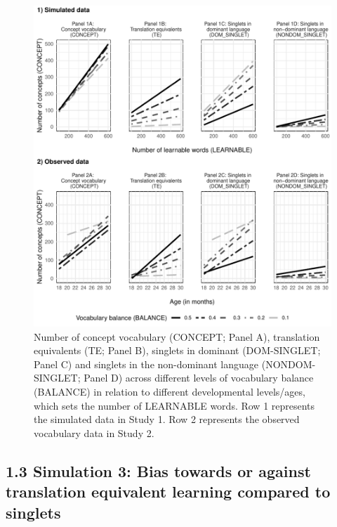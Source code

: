 \documentclass[
  english,
  ,man,floatsintext]{apa6}
\begin{document}
\begin{figure}[H]

{\centering \includegraphics[width=1\linewidth]{paper_TE_bilingual_vocabulary_model_files/figure-latex/fig2-1} 

}

\caption{Number of concept vocabulary (CONCEPT; Panel A), translation equivalents (TE; Panel B), singlets in dominant (DOM-SINGLET; Panel C) and singlets in the non-dominant language (NONDOM-SINGLET; Panel D) across different levels of vocabulary balance (BALANCE) in relation to different developmental levels/ages, which sets the number of LEARNABLE words. Row 1 represents the simulated data in Study 1. Row 2 represents the observed vocabulary data in Study 2.}\label{fig:fig2}
\end{figure}

\hypertarget{simulation-3-bias-towards-or-against-translation-equivalent-learning-compared-to-singlets}{%
\subsection{1.3 Simulation 3: Bias towards or against translation equivalent learning compared to singlets}\label{simulation-3-bias-towards-or-against-translation-equivalent-learning-compared-to-singlets}}
\end{document}
